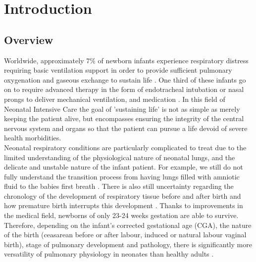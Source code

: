 \documentclass[12pt, openany, oneside]{book}
\begin{document}
\glsaddall
\setlength{\glsdescwidth}{0.5\linewidth}
\setlength{\glspagelistwidth}{0.1\linewidth}
\printnoidxglossary[type =acronym, sort = letter, title = Abbreviations]


\chapter{Introduction}

\section{Overview}
Worldwide, approximately 7{\%} of newborn infants experience respiratory distress requiring basic ventilation support in order to provide sufficient pulmonary oxygenation and gaseous exchange to sustain life \citep{edwards2013}. One third of these infants go on to require advanced therapy in the form of endotracheal intubation or nasal prongs to deliver mechanical ventilation, and medication \citep{wall2009neonatal}. In this field of Neonatal Intensive Care the goal of 'sustaining life' is not as simple as merely keeping the patient alive, but encompasses ensuring the integrity of the central nervous system and organs so that the patient can pursue a life devoid of severe health morbidities. \\

Neonatal respiratory conditions are particularly complicated to treat due to the limited understanding of the physiological nature of neonatal lungs, and the delicate and unstable nature of the infant patient. For example, we still do not fully understand the transition process from having lungs filled with amniotic fluid to the babies first breath \citep{hooper2013, burri1984fetal}. There is also still uncertainty regarding the chronology of the development of respiratory tissue before and after birth and how premature birth interrupts this development \citep{smith2010normal}. Thanks to improvements in the medical field, newborns of only 23-24 weeks gestation are able to survive. Therefore, depending on the infant's corrected gestational age (CGA), the nature of the birth (ceasarean before or after labour, induced or natural labour vaginal birth), stage of pulmonary development and pathology, there is significantly more versatility of pulmonary physiology in neonates than healthy adults \citep{lanteri1993changes, morrison1995neonatal,jain2006physiology}. \\
\end{document}
